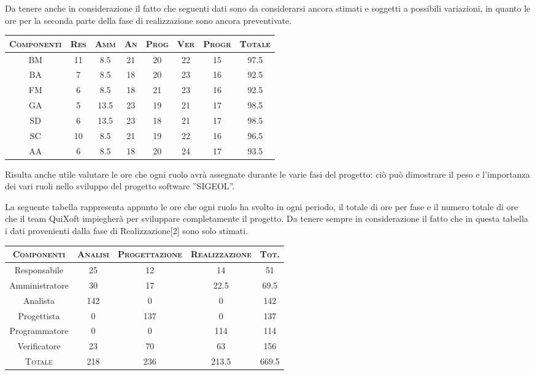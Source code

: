 \documentclass[11pt,a4paper]{article}
\begin{document}
Da tenere anche in considerazione il fatto che seguenti dati sono da considerarsi ancora stimati e soggetti a possibili variazioni, in quanto le ore per la seconda parte della fase di realizzazione sono ancora preventivate.
\\ \bigskip
\begin{center}
\begin{tabular}{|c||c|c|c|c|c|c||c|}
\hline
\textsc{Componenti} & \textsc{Res} & \textsc{Amm} & \textsc{An} & \textsc{Prog} & \textsc{Ver} & \textsc{Progr} & \textsc{Totale}\\
\hline \hline
BM & 11 & 8.5 & 21 & 20 & 22 & 15 & 97.5 \\ \hline
BA & 7 & 8.5 & 18 & 20 & 23 & 16 & 92.5 \\ \hline
FM & 6 & 8.5 & 18 & 21 & 23 & 16 & 92.5 \\ \hline
GA & 5 & 13.5 & 23 & 19 & 21 & 17 & 98.5 \\ \hline
SD & 6 & 13.5 & 23 & 18 & 21 & 17 & 98.5 \\ \hline
SC & 10 & 8.5 & 21 & 19 & 22 & 16 & 96.5 \\ \hline
AA & 6 & 8.5 & 18 & 20 & 24 & 17 & 93.5 \\ \hline
\end{tabular}
\end{center}
\bigskip

Risulta anche utile valutare le ore che ogni ruolo avrà assegnate durante le varie fasi del progetto: ciò può dimostrare il peso e l'importanza dei vari ruoli nello sviluppo del progetto software ''SIGEOL''.

La seguente tabella rappresenta appunto le ore che ogni ruolo ha svolto in ogni periodo, il totale di ore per fase e il numero totale di ore che il team QuiXoft impiegherà per sviluppare completamente il progetto. Da tenere sempre in considerazione il fatto che in questa tabella i dati provenienti dalla fase di Realizzazione[2] sono solo stimati.
\\
\begin{center}
\begin{tabular}{|c||c|c|c||c|}
\hline
\textsc{Componenti}& \textsc{Analisi} & \textsc{Progettazione} & \textsc{Realizzazione} & \textsc{Tot.} \\ \hline \hline
Responsabile & 25 & 12 & 14 & 51 \\ \hline
Amministratore & 30 & 17 & 22.5 & 69.5 \\ \hline
Analista & 142 & 0 & 0 & 142 \\ \hline
Progettista & 0 & 137 & 0 & 137 \\ \hline
Programmatore & 0 & 0 & 114 & 114 \\ \hline
Verificatore & 23 & 70 & 63 & 156 \\ \hline \hline
\textsc{Totale} & 218 & 236 & 213.5 & 669.5 \\ \hline
\end{tabular}
\end{center}
\bigskip
\end{document}

